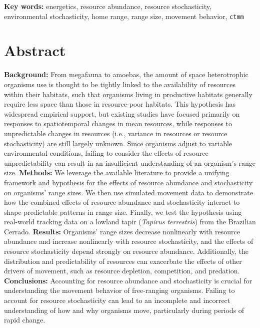 \documentclass[
  12pt,
]{article}
\begin{document}
\noindent \textbf{Key words:} energetics, resource abundance, resource stochasticity, environmental stochasticity, home range, range size, movement behavior, \texttt{ctmm}

\newpage

\doublespacing

\linenumbers

\section{Abstract}\label{abstract}

\noindent \textbf{Background:} From megafauna to amoebas, the amount of space heterotrophic organisms use is thought to be tightly linked to the availability of resources within their habitats, such that organisms living in productive habitats generally require less space than those in resource-poor habitats. This hypothesis has widespread empirical support, but existing studies have focused primarily on responses to spatiotemporal changes in mean resources, while responses to unpredictable changes in resources (i.e., variance in resources or resource stochasticity) are still largely unknown. Since organisms adjust to variable environmental conditions, failing to consider the effects of resource unpredictability can result in an insufficient understanding of an organism's range size. \textbf{Methods:} We leverage the available literature to provide a unifying framework and hypothesis for the effects of resource abundance and stochasticity on organisms' range sizes. We then use simulated movement data to demonstrate how the combined effects of resource abundance and stochasticity interact to shape predictable patterns in range size. Finally, we test the hypothesis using real-world tracking data on a lowland tapir (\emph{Tapirus terrestris}) from the Brazilian Cerrado. \textbf{Results:} Organisms' range sizes decrease nonlinearly with resource abundance and increase nonlinearly with resource stochasticity, and the effects of resource stochasticity depend strongly on resource abundance. Additionally, the distribution and predictability of resources can exacerbate the effects of other drivers of movement, such as resource depletion, competition, and predation. \textbf{Conclusions:} Accounting for resource abundance and stochasticity is crucial for understanding the movement behavior of free-ranging organisms. Failing to account for resource stochasticity can lead to an incomplete and incorrect understanding of how and why organisms move, particularly during periods of rapid change.
\end{document}
